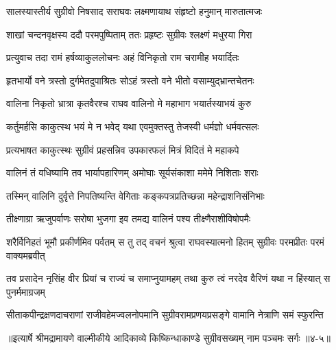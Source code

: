 \twolineshloka
{सालस्यास्तीर्य सुग्रीवो निषसाद सराघवः}
{लक्ष्मणायाथ संहृष्टो हनुमान् मारुतात्मजः} %

\twolineshloka
{शाखां चन्दनवृक्षस्य ददौ परमपुष्पिताम्}
{ततः प्रहृष्टः सुग्रीवः श्लक्ष्णं मधुरया गिरा} %

\twolineshloka
{प्रत्युवाच तदा रामं हर्षव्याकुललोचनः}
{अहं विनिकृतो राम चरामीह भयार्दितः} %

\twolineshloka
{हृतभार्यो वने त्रस्तो दुर्गमेतदुपाश्रितः}
{सोऽहं त्रस्तो वने भीतो वसाम्युद्भ्रान्तचेतनः} %

\twolineshloka
{वालिना निकृतो भ्रात्रा कृतवैरश्च राघव}
{वालिनो मे महाभाग भयार्तस्याभयं कुरु} %

\twolineshloka
{कर्तुमर्हसि काकुत्स्थ भयं मे न भवेद् यथा}
{एवमुक्तस्तु तेजस्वी धर्मज्ञो धर्मवत्सलः} %

\twolineshloka
{प्रत्यभाषत काकुत्स्थः सुग्रीवं प्रहसन्निव}
{उपकारफलं मित्रं विदितं मे महाकपे} %

\twolineshloka
{वालिनं तं वधिष्यामि तव भार्यापहारिणम्}
{अमोघाः सूर्यसंकाशा ममेमे निशिताः शराः} %

\twolineshloka
{तस्मिन् वालिनि दुर्वृत्ते निपतिष्यन्ति वेगिताः}
{कङ्कपत्रप्रतिच्छन्ना महेन्द्राशनिसंनिभाः} %

\twolineshloka
{तीक्ष्णाग्रा ऋजुपर्वाणः सरोषा भुजगा इव}
{तमद्य वालिनं पश्य तीक्ष्णैराशीविषोपमैः} %

\threelineshloka
{शरैर्विनिहतं भूमौ प्रकीर्णमिव पर्वतम्}
{स तु तद् वचनं श्रुत्वा राघवस्यात्मनो हितम्}
{सुग्रीवः परमप्रीतः परमं वाक्यमब्रवीत्} %

\twolineshloka
{तव प्रसादेन नृसिंह वीर प्रियां च राज्यं च समाप्नुयामहम्}
{तथा कुरु त्वं नरदेव वैरिणं यथा न हिंस्यात् स पुनर्ममाग्रजम्} %

\twolineshloka
{सीताकपीन्द्रक्षणदाचराणां राजीवहेमज्वलनोपमानि}
{सुग्रीवरामप्रणयप्रसङ्गे वामानि नेत्राणि समं स्फुरन्ति} %


॥इत्यार्षे श्रीमद्रामायणे वाल्मीकीये आदिकाव्ये किष्किन्धाकाण्डे सुग्रीवसख्यम् नाम पञ्चमः सर्गः ॥४-५॥
